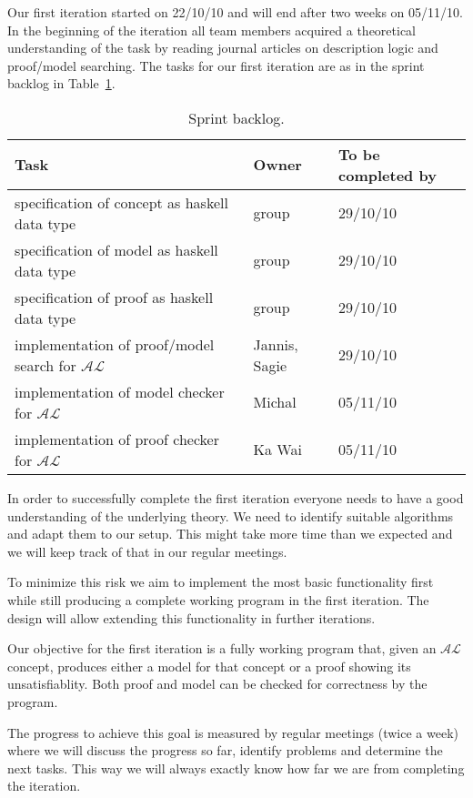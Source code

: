
Our first iteration started on 22/10/10 and will end after two weeks on 05/11/10.
In the beginning of the iteration all team members acquired a theoretical understanding
of the task by reading journal articles on description logic and proof/model searching.
The tasks for our first iteration are as in the sprint backlog in Table~\ref{sprint}.


\begin{table}
  \caption{Sprint backlog.}
  \begin{tabular}{l|l|l}
    \hline
    \textbf{Task} & \textbf{Owner} & \textbf{To be completed by} \\
    \hline
    specification of concept as haskell data type & group & 29/10/10 \\
    specification of model as haskell data type & group & 29/10/10 \\
    specification of proof as haskell data type & group & 29/10/10 \\
    implementation of proof/model search for $\mathcal{AL}$ & Jannis, Sagie & 29/10/10 \\
    implementation of model checker for $\mathcal{AL}$ & Michal & 05/11/10 \\
    implementation of proof checker for $\mathcal{AL}$ & Ka Wai & 05/11/10
  \end{tabular}
  \label{sprint}
\end{table}


In order to successfully complete the first iteration everyone needs to have a good
understanding of the underlying theory. We need to identify suitable algorithms and
adapt them to our setup. This might take more time than we expected and we will keep
track of that in our regular meetings.

To minimize this risk we aim to implement the most basic functionality first while
still producing a complete working program in the first iteration. The design will
allow extending this functionality in further iterations.


Our objective for the first iteration is a fully working program that, given an
$\mathcal{AL}$ concept, produces either a model for that concept or a proof showing its
unsatisfiablity. Both proof and model can be checked for correctness by the program.

The progress to achieve this goal is measured by regular meetings (twice a week) where
we will discuss the progress so far, identify problems and determine the next tasks. This
way we will always exactly know how far we are from completing the iteration.
